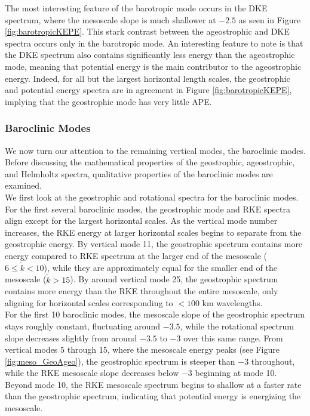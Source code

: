 The most interesting feature of the barotropic mode occurs in the DKE spectrum, where the  mesoscale slope is much shallower at $-2.5$ as seen in Figure \ref{fig:barotropicKEPE}. This stark contrast between the ageostrophic and DKE spectra occurs only in the barotropic mode. An interesting feature to note is that the DKE spectrum also contains significantly less energy than the ageostrophic mode, meaning that potential energy is the main contributor to the ageostrophic energy. Indeed, for all but the largest horizontal length scales, the geostrophic and potential energy spectra are in agreement in Figure \ref{fig:barotropicKEPE}, implying that the geostrophic mode has very little APE.

\subsubsection{Baroclinic Modes}
\label{sec:baroclinicanalysis}
We now turn our attention to the remaining vertical modes, the baroclinic modes. Before discussing the mathematical properties of the geostrophic, ageostrophic, and Helmholtz spectra, qualitative properties of the baroclinic modes are examined.\\

We first look at the geostrophic and rotational spectra for the baroclinic modes. For the first several baroclinic modes, the geostrophic mode and RKE spectra align except for the largest horizontal scales. As the vertical mode number increases, the RKE energy at larger horizontal scales begins to separate from the geostrophic energy. By vertical mode 11, the geostrophic spectrum contains more energy compared to RKE spectrum at the larger end of the mesoscale ($6 \leq \tilde{k} < 10$), while they are approximately equal for the smaller end of the mesoscale ($\tilde{k} > 15$). By around vertical mode 25, the geostrophic spectrum contains more energy than the RKE throughout the entire mesoscale, only aligning for horizontal scales corresponding to $<100$ km wavelengths.\\

For the first 10 baroclinic modes, the mesoscale slope of the geostrophic spectrum stays roughly constant, fluctuating around $-3.5$, while the rotational spectrum slope decreases slightly from around $-3.5$ to $-3$ over this same range. From vertical modes 5 through 15, where the mesoscale energy peaks (see Figure \ref{fig:meso_GeoAgeo}), the geostrophic spectrum is steeper than $-3$ throughout, while the RKE mesoscale slope decreases below $-3$ beginning at mode 10. Beyond mode 10, the RKE mesoscale spectrum begins to shallow at a faster rate than the geostrophic spectrum, indicating that potential energy is energizing the mesoscale.\\

